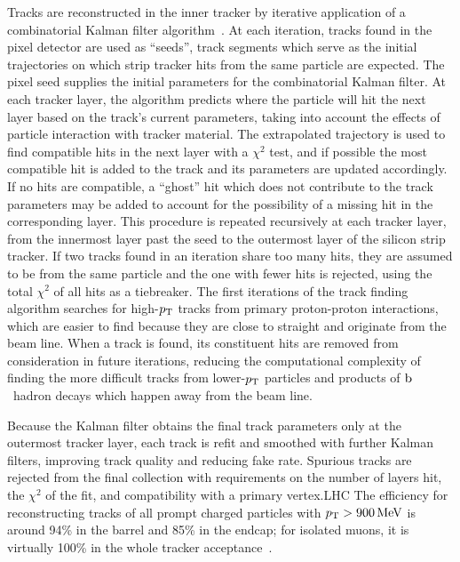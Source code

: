 Tracks are reconstructed in the inner tracker by iterative application of a combinatorial Kalman filter algorithm~\cite{Fruhwirth:1987fm,Billoir:1990we,Adam:2005cg,Chatrchyan:2014fea}.
At each iteration, tracks found in the pixel detector are used as ``seeds'', track segments which serve as the initial trajectories on which strip tracker hits from the same particle are expected.
The pixel seed supplies the initial parameters for the combinatorial Kalman filter.
At each tracker layer, the algorithm predicts where the particle will hit the next layer based on the track's current parameters, taking into account the effects of particle interaction with tracker material.
The extrapolated trajectory is used to find compatible hits in the next layer with a $\chi^2$ test, and if possible the most compatible hit is added to the track and its parameters are updated accordingly.
If no hits are compatible, a ``ghost'' hit which does not contribute to the track parameters may be added to account for the possibility of a missing hit in the corresponding layer.
This procedure is repeated recursively at each tracker layer, from the innermost layer past the seed to the outermost layer of the silicon strip tracker.
If two tracks found in an iteration share too many hits, they are assumed to be from the same particle and the one with fewer hits is rejected, using the total $\chi^2$ of all hits as a tiebreaker.
The first iterations of the track finding algorithm searches for high-$p_\mathrm{T}$ tracks from primary proton-proton interactions, which are easier to find because they are close to straight and originate from the beam line.
When a track is found, its constituent hits are removed from consideration in future iterations, reducing the computational complexity of finding the more difficult tracks from lower-$p_\mathrm{T}$ particles and products of $\mathrm{b}$~hadron decays which happen away from the beam line.

Because the Kalman filter obtains the final track parameters only at the outermost tracker layer, each track is refit and smoothed with further Kalman filters, improving track quality and reducing fake rate.
Spurious tracks are rejected from the final collection with requirements on the number of layers hit, the $\chi^2$ of the fit, and compatibility with a primary vertex.LHC
The efficiency for reconstructing tracks of all prompt charged particles with $p_\mathrm{T} > 900\,\mathrm{Me\hspace{-.08em}V}$ is around 94\% in the barrel and 85\% in the endcap; for isolated muons, it is virtually 100\% in the whole tracker acceptance~\cite{Chatrchyan:2014fea}.

